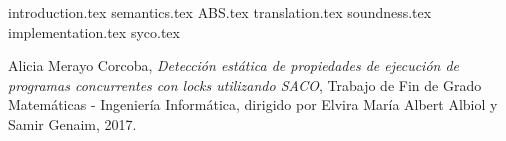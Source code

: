 \documentclass[spanish, a4paper, 12pt] {book}
\begin{document}
{introduction.tex}
{semantics.tex}
{ABS.tex}
{translation.tex}
{soundness.tex}
{implementation.tex}
{syco.tex}

\begin{thebibliography}{9}

  Alicia Merayo Corcoba,
  \textit{Detección estática de propiedades de ejecución de programas concurrentes con locks utilizando SACO},
  Trabajo de Fin de Grado Matemáticas - Ingeniería Informática,
  dirigido por Elvira María Albert Albiol y Samir Genaim,
  2017.

\end{thebibliography}
\end{document}
